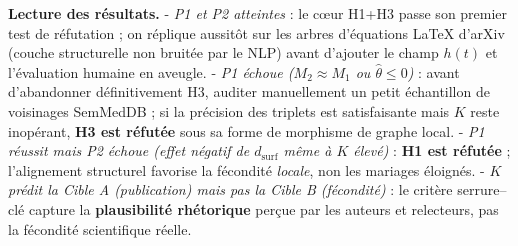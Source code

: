 \documentclass[a4paper,11pt]{article}
\begin{document}
\textbf{Lecture des résultats.} - \emph{P1 et P2 atteintes} : le cœur
H1+H3 passe son premier test de réfutation ; on réplique aussitôt sur
les arbres d'équations LaTeX d'arXiv (couche structurelle non bruitée
par le NLP) avant d'ajouter le champ \(h(t)\) et l'évaluation humaine en
aveugle. - \emph{P1 échoue (\(M_2 \approx M_1\) ou
\(\hat{\theta} \le 0\))} : avant d'abandonner définitivement H3, auditer
manuellement un petit échantillon de voisinages SemMedDB ; si la
précision des triplets est satisfaisante mais \(K\) reste inopérant,
\textbf{H3 est réfutée} sous sa forme de morphisme de graphe local. -
\emph{P1 réussit mais P2 échoue (effet négatif de \(d_{\mathrm{surf}}\)
même à \(K\) élevé)} : \textbf{H1 est réfutée} ; l'alignement structurel
favorise la fécondité \emph{locale}, non les mariages éloignés. -
\emph{\(K\) prédit la Cible A (publication) mais pas la Cible B
(fécondité)} : le critère serrure--clé capture la \textbf{plausibilité
rhétorique} perçue par les auteurs et relecteurs, pas la fécondité
scientifique réelle.
\end{document}

